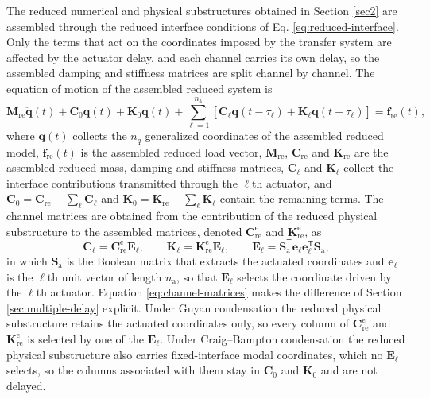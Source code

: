 \documentclass[11pt,a4paper]{article}
\numberwithin{equation}{section}
\begin{document}
The reduced numerical and physical substructures obtained in Section \ref{sec2} are assembled through the reduced interface conditions of Eq. \eqref{eq:reduced-interface}. Only the terms that act on the coordinates imposed by the transfer system are affected by the actuator delay, and each channel carries its own delay, so the assembled damping and stiffness matrices are split channel by channel. The equation of motion of the assembled reduced system is
\begin{equation}
	\mathbf{M}_{\mathrm{re}}\ddot{\bm{q}}(t)+\mathbf{C}_{0}\dot{\bm{q}}(t)+\mathbf{K}_{0}\bm{q}(t)
	+\sum_{\ell=1}^{n_{\mathrm{a}}}
	\left[
	\mathbf{C}_{\ell}\dot{\bm{q}}(t-\tau_{\ell})
	+\mathbf{K}_{\ell}\bm{q}(t-\tau_{\ell})
	\right]
	=\bm{f}_{\mathrm{re}}(t),
	\label{eq:delayed-eom}
\end{equation}
where \(\bm{q}(t)\) collects the \(n_{q}\) generalized coordinates of the assembled reduced model, \(\bm{f}_{\mathrm{re}}(t)\) is the assembled reduced load vector, \(\mathbf{M}_{\mathrm{re}}\), \(\mathbf{C}_{\mathrm{re}}\) and \(\mathbf{K}_{\mathrm{re}}\) are the assembled reduced mass, damping and stiffness matrices, \(\mathbf{C}_{\ell}\) and \(\mathbf{K}_{\ell}\) collect the interface contributions transmitted through the \(\ell\)th actuator, and \(\mathbf{C}_{0}=\mathbf{C}_{\mathrm{re}}-\sum_{\ell}\mathbf{C}_{\ell}\) and \(\mathbf{K}_{0}=\mathbf{K}_{\mathrm{re}}-\sum_{\ell}\mathbf{K}_{\ell}\) contain the remaining terms. The channel matrices are obtained from the contribution of the reduced physical substructure to the assembled matrices, denoted \(\mathbf{C}_{\mathrm{re}}^{\mathrm{e}}\) and \(\mathbf{K}_{\mathrm{re}}^{\mathrm{e}}\), as
\begin{equation}
	\mathbf{C}_{\ell}=\mathbf{C}_{\mathrm{re}}^{\mathrm{e}}\mathbf{E}_{\ell},
		\qquad
		\mathbf{K}_{\ell}=\mathbf{K}_{\mathrm{re}}^{\mathrm{e}}\mathbf{E}_{\ell},
		\qquad
		\mathbf{E}_{\ell}=\mathbf{S}_{\mathrm{a}}^{\mathsf{T}}\bm{e}_{\ell}\bm{e}_{\ell}^{\mathsf{T}}\mathbf{S}_{\mathrm{a}},
	\label{eq:channel-matrices}
\end{equation}
in which \(\mathbf{S}_{\mathrm{a}}\) is the Boolean matrix that extracts the actuated coordinates and \(\bm{e}_{\ell}\) is the \(\ell\)th unit vector of length \(n_{\mathrm{a}}\), so that \(\mathbf{E}_{\ell}\) selects the coordinate driven by the \(\ell\)th actuator. Equation \eqref{eq:channel-matrices} makes the difference of Section \ref{sec:multiple-delay} explicit. Under Guyan condensation the reduced physical substructure retains the actuated coordinates only, so every column of \(\mathbf{C}_{\mathrm{re}}^{\mathrm{e}}\) and \(\mathbf{K}_{\mathrm{re}}^{\mathrm{e}}\) is selected by one of the \(\mathbf{E}_{\ell}\). Under Craig--Bampton condensation the reduced physical substructure also carries fixed-interface modal coordinates, which no \(\mathbf{E}_{\ell}\) selects, so the columns associated with them stay in \(\mathbf{C}_{0}\) and \(\mathbf{K}_{0}\) and are not delayed.
\end{document}
